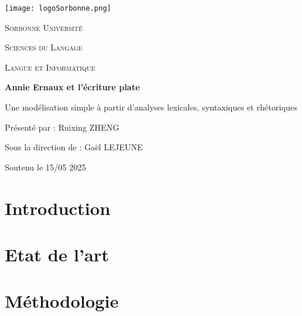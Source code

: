 \documentclass[12pt,a4paper]{report}
\begin{document}
\begin{titlepage}
    \centering
    \texttt{[image: logoSorbonne.png]}\par
    \vspace{1cm}
    
    {\scshape\LARGE Sorbonne Université \par}
    \vspace{1.5cm}
    
    {\scshape\Large Sciences du Langage\par}
    \vspace{0.5cm}
    
    {\scshape\Large Langue et Informatique\par}
    \vspace{1.5cm}
    
    {\huge\bfseries Annie Ernaux et l'écriture plate\par}

    \vspace{0.5cm}
    {\Large Une modélisation simple à partir d’analyses lexicales, syntaxiques et rhétoriques\par}
    \vspace{2cm}
    
    {\Large Présenté par : Ruixing ZHENG\par}
    \vspace{0.5cm}
    
    {\large Sous la direction de :  
    Gaël LEJEUNE\par}
    \vfill
    
    {\Large Soutenu le 15/05 2025\par}
\end{titlepage}






\tableofcontents
\newpage

\chapter{Introduction}

\chapter{Etat de l'art}
\label{chap:Etat_de_l'art}

\chapter{Méthodologie} \label{chap:Méthodologie}

\end{document}
